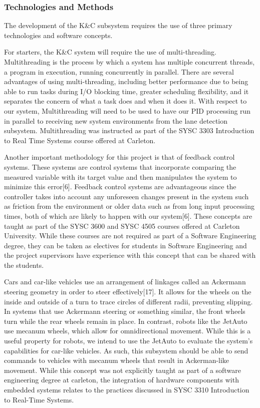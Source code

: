 \documentclass[titlepage]{article}
\begin{document}
{\subsubsection{Technologies and Methods}
The development of the K\&C subsystem requires the use of three primary technologies and software concepts.

For starters, the K\&C system will require the use of multi-threading. Multithreading is the process by which a system has multiple concurrent threads, a program in execution, running concurrently in parallel. There are several advantages of using multi-threading, including better performance due to being able to run tasks during I/O blocking time, greater scheduling flexibility, and it separates the concern of what a task does and when it does it. With respect to our system, Multithreading will need to be used to have our PID processing run in parallel to receiving new system environments from the lane detection subsystem. Multithreading was instructed as part of the SYSC 3303 Introduction to Real Time Systems course offered at Carleton.

Another important methodology for this project is that of feedback control systems. These systems are control systems that incorporate comparing the measured variable with its target value and then manipulates the system to minimize this error[6]. Feedback control systems are advantageous since the controller takes into account any unforeseen changes present in the system such as friction from the environment or older data such as from long input processing times, both of which are likely to happen with our system[6]. These concepts are taught as part of the SYSC 3600 and SYSC 4505 courses offered at Carleton University. While these courses are not required as part of a Software Engineering degree, they can be taken as electives for students in Software Engineering and the project supervisors have experience with this concept that can be shared with the students.

Cars and car-like vehicles use an arrangement of linkages called an Ackermann steering geometry in order to steer effectively[17]. It allows for the wheels on the inside and outside of a turn to trace circles of different radii, preventing slipping. In systems that use Ackermann steering or something similar, the front wheels turn while the rear wheels remain in place. In contrast, robots like the JetAuto use mecanum wheels, which allow for omnidirectional movement. While this is a useful property for robots, we intend to use the JetAuto to evaluate the system’s capabilities for car-like vehicles. As such, this subsystem should be able to send commands to vehicles with mecanum wheels that result in Ackerman-like movement. While this concept was not explicitly taught as part of a software engineering degree at carleton, the integration of hardware components with embedded systems relates to the practices discussed in SYSC 3310 Introduction to Real-Time Systems.

}
\end{document}
